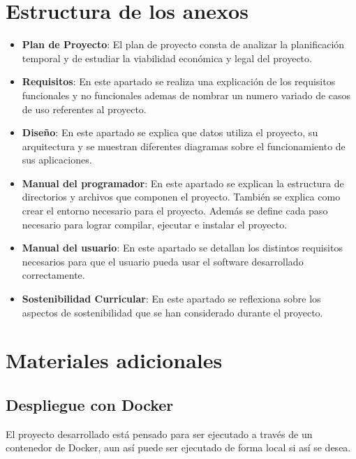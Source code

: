 \section{Estructura de los anexos}
\begin{itemize}
   \item \textbf{Plan de Proyecto}: El plan de proyecto consta de analizar la planificación temporal y de estudiar la viabilidad económica y legal del proyecto.
    \item \textbf{Requisitos}: En este apartado se realiza una explicación de los requisitos funcionales y no funcionales ademas de nombrar un numero variado de casos de uso referentes al proyecto.
    \item \textbf{Diseño}: En este apartado se explica que datos utiliza el proyecto, su arquitectura y se muestran diferentes diagramas sobre el funcionamiento de sus aplicaciones.
    \item \textbf{Manual del programador}: En este apartado se explican la estructura de directorios y archivos que componen el proyecto. También se explica como crear el entorno necesario para el proyecto. Además se define cada paso necesario para lograr compilar, ejecutar e instalar el proyecto.
    \item \textbf{Manual del usuario}: En este apartado se detallan los distintos requisitos necesarios para que el usuario pueda usar el software desarrollado correctamente.
    \item \textbf{Sostenibilidad Curricular}: En este apartado se reflexiona sobre los aspectos de sostenibilidad que se han considerado durante el proyecto.
\end{itemize}

\section{Materiales adicionales}
\subsection{Despliegue con Docker}
El proyecto desarrollado está pensado para ser ejecutado a través de un contenedor de Docker, aun así puede ser ejecutado de forma local si así se desea.
